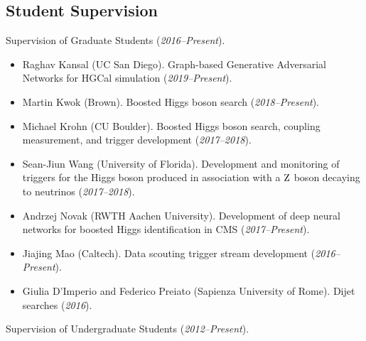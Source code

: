 \documentclass[11pt]{res}
\newcommand{\MarginText}[1]{\section{#1}\vspace{10pt}}
\begin{document}
\begin{resume}
\MarginText{Student Supervision}

Supervision of Graduate Students (\textit{2016--Present}).

\begin{itemize}
\item Raghav Kansal (UC San Diego). Graph-based Generative Adversarial
  Networks for HGCal simulation (\textit{2019--Present}).
\item Martin Kwok (Brown). Boosted Higgs boson search (\textit{2018--Present}).
\item Michael Krohn (CU Boulder). Boosted Higgs boson search, coupling
  measurement, and trigger development (\textit{2017--2018}).
\item Sean-Jiun Wang (University of Florida). Development and
  monitoring of triggers for the Higgs boson produced in association with a
  $\mathrm{Z}$ boson decaying to neutrinos (\textit{2017--2018}).
\item Andrzej Novak (RWTH Aachen University). Development of deep neural
  networks for boosted Higgs identification in CMS (\textit{2017--Present}).
\item Jiajing Mao (Caltech). Data scouting trigger stream development (\textit{2016--Present}).
\item Giulia D'Imperio and Federico Preiato (Sapienza University of Rome). Dijet searches (\textit{2016}).
\end{itemize}

Supervision of Undergraduate Students (\textit{2012--Present}).


\end{resume}
\end{document}
